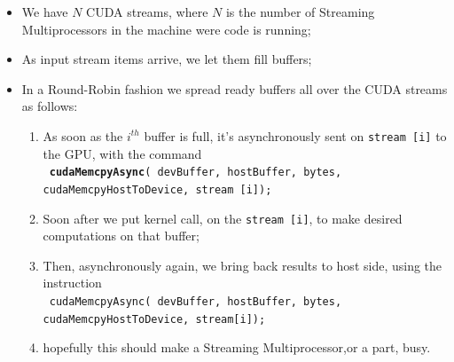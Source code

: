 		
	\begin{itemize}
		\item We have \(N\) CUDA streams, where \(N\) is the number of Streaming Multiprocessors in the machine were code is running;
		\item As input stream items arrive, we let them fill buffers;
		
		\item In a Round-Robin fashion we spread ready buffers all over the CUDA streams as follows:
		\begin{enumerate}
			\item As soon as the \(i^{th}\) buffer is full, it's asynchronously sent on \texttt{stream [i]} to the GPU, with the command \\ 
			\texttt{ \textbf{cudaMemcpyAsync}( devBuffer, hostBuffer, bytes, cudaMemcpyHostToDevice, \tab \tab \tab \tab stream [i]);}
			
			\item Soon after we put kernel call, on the \texttt{stream [i]}, to make desired computations on that buffer;
			
			\item Then, asynchronously again, we bring back results to host side, using the instruction \\
			\texttt{ cudaMemcpyAsync( devBuffer, hostBuffer, bytes, cudaMemcpyHostToDevice, \tab \tab \tab \tab stream[i]);}
			\item hopefully this should make a Streaming Multiprocessor,or a part, busy.
		\end{enumerate}
	\end{itemize}

